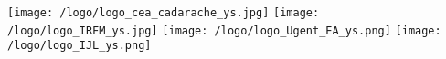 \begin{titlepage}
\begin{center}
\texttt{[image: /logo/logo\_cea\_cadarache\_ys.jpg]} \hspace{+0.5cm}
\texttt{[image: /logo/logo\_IRFM\_ys.jpg]} \hspace{+0.5cm}
\texttt{[image: /logo/logo\_Ugent\_EA\_ys.png]} \hspace{+0.5cm}
\texttt{[image: /logo/logo\_IJL\_ys.png]} \\


\end{center}


\end{titlepage}





